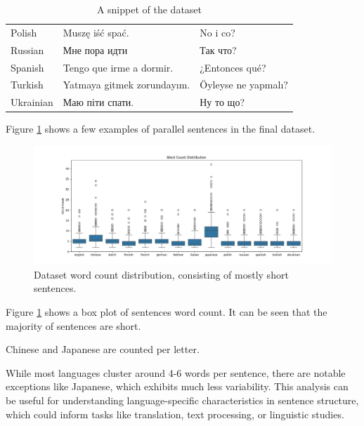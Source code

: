 \documentclass[a4paper]{article}
\begin{document}
\begin{CJK}{UTF8}{gbsn}
\begin{table}[htbp]
\begin{tabular}{|l|l|l|}
            Polish            & Muszę iść spać.                       & No i co?                              \\
            Russian           & Мне пора идти                         & Так что?                              \\
            Spanish           & Tengo que irme a dormir.              & ¿Entonces qué?                        \\
            Turkish           & Yatmaya gitmek zorundayım.            & Öyleyse ne yapmalı?                   \\
            Ukrainian         & Маю піти спати.                       & Ну то що?                             \\
            \hline
        \end{tabular}
        \caption{A snippet of the dataset}
        \label{table:parallel_sentence}
    \end{table}
\end{CJK}

Figure \ref{table:parallel_sentence} shows a few examples of parallel sentences in the final dataset.

\begin{figure}[htbp]
    \centering
    \includegraphics[width=1\linewidth]{figures/word_count_box.png}
    \caption{Dataset word count distribution, consisting of mostly short sentences.}
    \label{fig:word_count_box}
\end{figure}

Figure \ref{fig:word_count_box} shows a box plot of sentences word count. It can be seen that the majority of sentences are short.

Chinese and Japanese are counted per letter.

While most languages cluster around 4-6 words per sentence, there are notable exceptions like Japanese, which exhibits much less variability. This analysis can be useful for understanding language-specific characteristics in sentence structure, which could inform tasks like translation, text processing, or linguistic studies.
\end{document}

